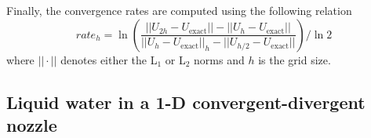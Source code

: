 Finally, the convergence rates are computed using the following relation 
\begin{equation}
\label{eq:conv_rates}
rate_h = \ln \left( \frac{|| U_{2h}-U_{\text{exact}} || - || U_{h}-U_{\text{exact}} ||}{|| U_{h}-U_{\text{exact}} ||_h - || U_{h/2}-U_{\text{exact}} || } \right) / \ln 2
\end{equation}
where $|| \cdot ||$ denotes either the L$_1$ or L$_2$ norms and $h$ is the grid size.

\subsection{Liquid water in a 1-D convergent-divergent nozzle} \label{sec:liquid_nozzle}

